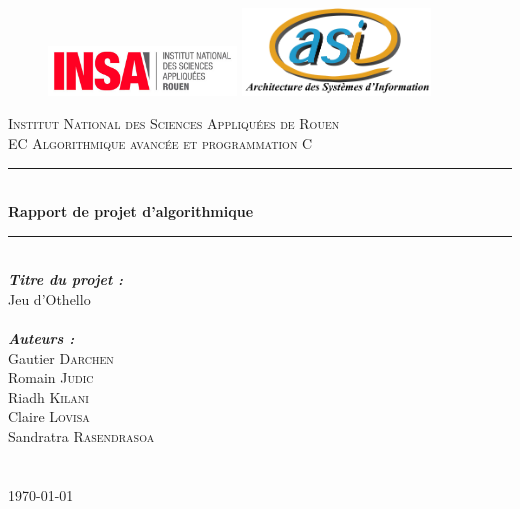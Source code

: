 \documentclass[11pt]{report}
\begin{document}
\begin{titlepage}
\thispagestyle{empty}
\begin{figure}
	\includegraphics[width=5cm]{Illustrations/Insa.png}\hfill
	\includegraphics[width=5cm]{Illustrations/ASI.png}\
\end{figure}

\newcommand{\HRule}{\rule{\linewidth}{0.5mm}} 
\center 
{}\textsc{\huge Institut National des Sciences Appliqu\'{e}es de Rouen}\\[1.5cm] 
\textsc{\Large EC Algorithmique avancée et programmation C}\\[2cm] 

\HRule \\[0.4cm]
{ \huge \bfseries Rapport de projet d'algorithmique}\\[0.2cm] 
\HRule \\[2.5cm]
 
\LARGE \emph{\textbf{Titre du projet : }}\\
\LARGE{ \og Jeu d'Othello \fg}\\
~\\[2cm] 


\large \emph{\textbf{Auteurs :}}\\
Gautier \textsc{Darchen}\\ 
Romain \textsc{Judic}\\
Riadh \textsc{Kilani}\\
Claire \textsc{Lovisa}\\
Sandratra \textsc{Rasendrasoa}\\

~\\ ~\\[1cm]

\vfill{\today}\\[3cm]

\end{titlepage}

\thispagestyle{empty}
\clearpage\mbox{}\clearpage
\end{document}
